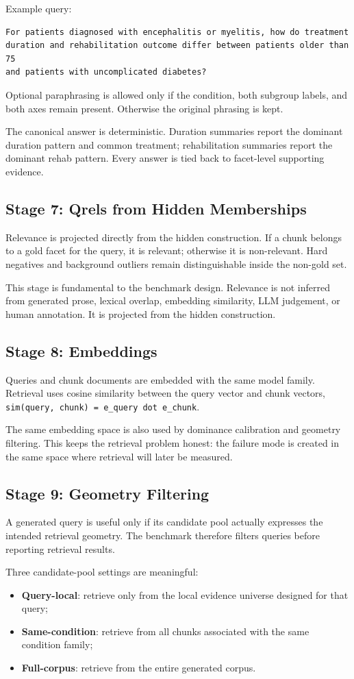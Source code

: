 \documentclass[11pt,a4paper]{article}
\newcommand{\field}[1]{\texttt{#1}}
\newcommand{\stage}[2]{\subsection{\textcolor{betterblue}{#1}: #2}}
\begin{document}
Example query:

\begin{lstlisting}[style=promptstyle]
For patients diagnosed with encephalitis or myelitis, how do treatment
duration and rehabilitation outcome differ between patients older than 75
and patients with uncomplicated diabetes?
\end{lstlisting}

Optional paraphrasing is allowed only if the condition, both subgroup labels, and both axes remain present. Otherwise the original phrasing is kept.

The canonical answer is deterministic. Duration summaries report the dominant duration pattern and common treatment; rehabilitation summaries report the dominant rehab pattern. Every answer is tied back to facet-level supporting evidence.

\stage{Stage 7}{Qrels from Hidden Memberships}

Relevance is projected directly from the hidden construction. If a chunk belongs to a gold facet for the query, it is relevant; otherwise it is non-relevant. Hard negatives and background outliers remain distinguishable inside the non-gold set.

This stage is fundamental to the benchmark design. Relevance is not inferred from generated prose, lexical overlap, embedding similarity, LLM judgement, or human annotation. It is projected from the hidden construction.

\stage{Stage 8}{Embeddings}

Queries and chunk documents are embedded with the same model family. Retrieval uses cosine similarity between the query vector and chunk vectors, \field{sim(query, chunk) = e\_query dot e\_chunk}.

The same embedding space is also used by dominance calibration and geometry filtering. This keeps the retrieval problem honest: the failure mode is created in the same space where retrieval will later be measured.

\stage{Stage 9}{Geometry Filtering}

A generated query is useful only if its candidate pool actually expresses the intended retrieval geometry. The benchmark therefore filters queries before reporting retrieval results.

Three candidate-pool settings are meaningful:

\begin{itemize}[noitemsep, topsep=0pt]
	\item \textbf{Query-local}: retrieve only from the local evidence universe designed for that query;
	\item \textbf{Same-condition}: retrieve from all chunks associated with the same condition family;
	\item \textbf{Full-corpus}: retrieve from the entire generated corpus.
\end{itemize}
\end{document}
